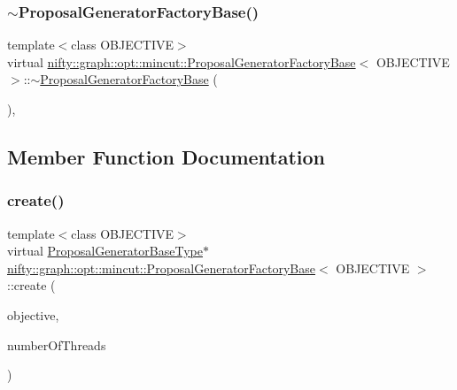 \subsubsection{\texorpdfstring{$\sim$\+Proposal\+Generator\+Factory\+Base()}{~ProposalGeneratorFactoryBase()}}
{\footnotesize\ttfamily template$<$class O\+B\+J\+E\+C\+T\+I\+VE$>$ \\
virtual \hyperlink{classnifty_1_1graph_1_1opt_1_1mincut_1_1ProposalGeneratorFactoryBase}{nifty\+::graph\+::opt\+::mincut\+::\+Proposal\+Generator\+Factory\+Base}$<$ O\+B\+J\+E\+C\+T\+I\+VE $>$\+::$\sim$\hyperlink{classnifty_1_1graph_1_1opt_1_1mincut_1_1ProposalGeneratorFactoryBase}{Proposal\+Generator\+Factory\+Base} (\begin{DoxyParamCaption}{ }\end{DoxyParamCaption})\hspace{0.3cm}{\ttfamily [inline]}, {\ttfamily [virtual]}}



\subsection{Member Function Documentation}
\mbox{\label{classnifty_1_1graph_1_1opt_1_1mincut_1_1ProposalGeneratorFactoryBase_a29fe8a5d3418f0413785f52c8819bd2f}} 
\subsubsection{\texorpdfstring{create()}{create()}}
{\footnotesize\ttfamily template$<$class O\+B\+J\+E\+C\+T\+I\+VE$>$ \\
virtual \hyperlink{classnifty_1_1graph_1_1opt_1_1mincut_1_1ProposalGeneratorFactoryBase_a6c03cbefa18b1f47e337d700d774cd97}{Proposal\+Generator\+Base\+Type}$\ast$ \hyperlink{classnifty_1_1graph_1_1opt_1_1mincut_1_1ProposalGeneratorFactoryBase}{nifty\+::graph\+::opt\+::mincut\+::\+Proposal\+Generator\+Factory\+Base}$<$ O\+B\+J\+E\+C\+T\+I\+VE $>$\+::create (\begin{DoxyParamCaption}\item[{const \hyperlink{classnifty_1_1graph_1_1opt_1_1mincut_1_1ProposalGeneratorFactoryBase_a51fcc2cc6c0db5a4d48609e0f9716f1b}{Objective\+Type} \&}]{objective,  }\item[{const size\+\_\+t}]{number\+Of\+Threads }\end{DoxyParamCaption})\hspace{0.3cm}{\ttfamily [pure virtual]}}


